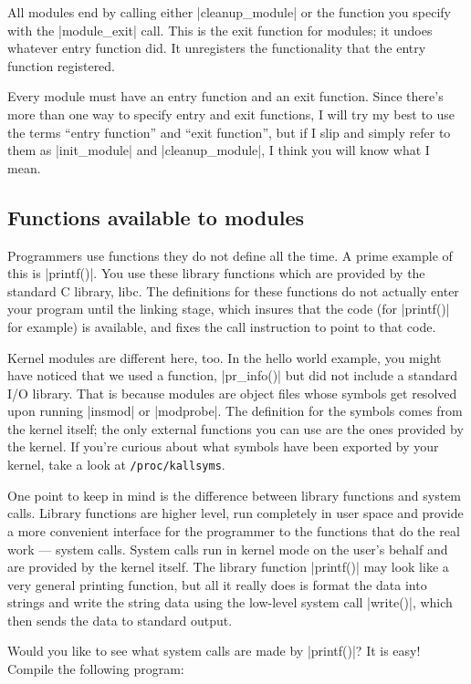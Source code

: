 \documentclass[10pt, oneside]{book}
\begin{document}
All modules end by calling either \cpp|cleanup_module| or the function you specify with the \cpp|module_exit| call.
This is the exit function for modules; it undoes whatever entry function did.
It unregisters the functionality that the entry function registered.

Every module must have an entry function and an exit function.
Since there's more than one way to specify entry and exit functions, I will try my best to use the terms ``entry function'' and ``exit function'', but if I slip and simply refer to them as \cpp|init_module| and \cpp|cleanup_module|, I think you will know what I mean.

\subsection{Functions available to modules}
\label{sec:avail_func}
Programmers use functions they do not define all the time.
A prime example of this is \cpp|printf()|.
You use these library functions which are provided by the standard C library, libc.
The definitions for these functions do not actually enter your program until the linking stage, which insures that the code (for \cpp|printf()| for example) is available, and fixes the call instruction to point to that code.

Kernel modules are different here, too. In the hello world example, you might have noticed that we used a function, \cpp|pr_info()| but did not include a standard I/O library.
That is because modules are object files whose symbols get resolved upon running \sh|insmod| or \sh|modprobe|.
The definition for the symbols comes from the kernel itself; the only external functions you can use are the ones provided by the kernel.
If you're curious about what symbols have been exported by your kernel, take a look at \verb|/proc/kallsyms|.

One point to keep in mind is the difference between library functions and system calls. Library functions are higher level, run completely in user space and provide a more convenient interface for the programmer to the functions that do the real work --- system calls.
System calls run in kernel mode on the user's behalf and are provided by the kernel itself.
The library function \cpp|printf()| may look like a very general printing function, but all it really does is format the data into strings and write the string data using the low-level system call \cpp|write()|, which then sends the data to standard output.

Would you like to see what system calls are made by \cpp|printf()|?
It is easy!
Compile the following program:
\end{document}
